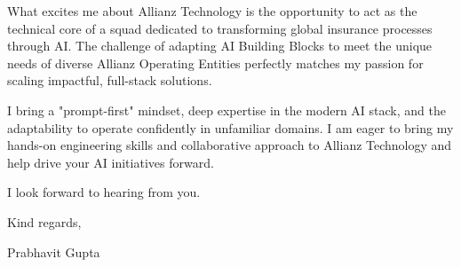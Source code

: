 \documentclass[11pt,a4paper]{article}
\begin{document}
What excites me about Allianz Technology is the opportunity to act as the technical core of a squad dedicated to transforming global insurance processes through AI. The challenge of adapting AI Building Blocks to meet the unique needs of diverse Allianz Operating Entities perfectly matches my passion for scaling impactful, full-stack solutions.

I bring a "prompt-first" mindset, deep expertise in the modern AI stack, and the adaptability to operate confidently in unfamiliar domains. I am eager to bring my hands-on engineering skills and collaborative approach to Allianz Technology and help drive your AI initiatives forward.

I look forward to hearing from you.

\vspace{1.5em}
Kind regards,

\vspace{1.5em}
Prabhavit Gupta
\end{document}

